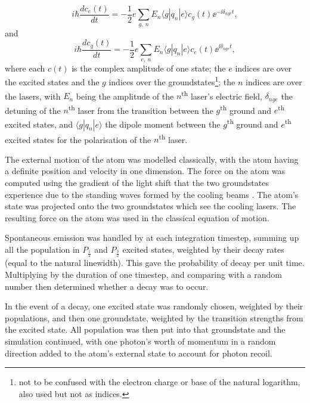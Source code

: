 \begin{equation}
i\hbar\frac{dc_e(t)}{dt} = -\frac12e\sum_{g,\ n} E_n \langle g |  q_n | e \rangle c_g(t) \ee^{-\ii\delta_{nge}t},
\end{equation}
and
\begin{equation}
i\hbar\frac{dc_g(t)}{dt} = -\frac12e\sum_{e,\ n} E_n \langle g |  q_n | e \rangle c_e(t) \ee^{\ii\delta_{nge}t},
\end{equation}
where each $c(t)$ is the complex amplitude of one state; the $e$ indices are over the excited states and the $g$ indices over the groundstates\footnote{not to be confused with the electron charge or base of the natural logarithm, also used but not as indices.}; the $n$ indices are over the lasers, with $E_n$ being the amplitude of the $n$\textsuperscript{th} laser's electric field, $\delta_{nge}$ the detuning of the $n$\textsuperscript{th} laser from the transition between the $g$\textsuperscript{th} ground and $e$\textsuperscript{th} excited states, and $\langle g |  q_n | e \rangle$ the dipole moment between the $g$\textsuperscript{th} ground and $e$\textsuperscript{th} excited states for the polarisation of the $n$\textsuperscript{th} laser.

The external motion of the atom was modelled classically, with the atom having a definite position and velocity in one dimension. The force on the atom was computed using the gradient of the light shift that the two groundstates experience due to the standing waves formed by the cooling beams \cite[eqn 3.16, p 33]{metcalf_laser_1999}. The atom's state was projected onto the two groundstates which see the cooling lasers. The resulting force on the atom was used in the classical equation of motion.

Spontaneous emission was handled by at each integration timestep, summing up all the population in $P_\frac12$ and $P_\frac32$ excited states, weighted by their decay rates (equal to the natural linewidth). This gave the probability of decay per unit time. Multiplying by the duration of one timestep, and comparing with a random number then determined whether a decay was to occur.

In the event of a decay, one excited state was randomly chosen, weighted by their populations, and then one groundstate, weighted by the transition strengths from the excited state. All population was then put into that groundstate and the simulation continued, with one photon's worth of momentum in a random direction added to the atom's external state to account for photon recoil.

